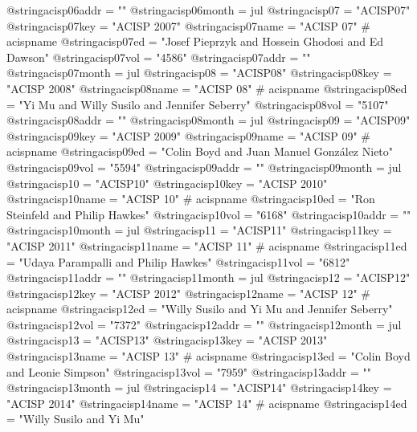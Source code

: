 @string{acisp06addr =           ""}
@string{acisp06month =          jul}
@string{acisp07 =               "ACISP07"}
@string{acisp07key =            "ACISP 2007"}
@string{acisp07name =           "ACISP 07" # acispname}
@string{acisp07ed =             "Josef Pieprzyk and Hossein Ghodosi and Ed Dawson"}
@string{acisp07vol =            "4586"}
@string{acisp07addr =           ""}
@string{acisp07month =          jul}
@string{acisp08 =               "ACISP08"}
@string{acisp08key =            "ACISP 2008"}
@string{acisp08name =           "ACISP 08" # acispname}
@string{acisp08ed =             "Yi Mu and Willy Susilo and Jennifer Seberry"}
@string{acisp08vol =            "5107"}
@string{acisp08addr =           ""}
@string{acisp08month =          jul}
@string{acisp09 =               "ACISP09"}
@string{acisp09key =            "ACISP 2009"}
@string{acisp09name =           "ACISP 09" # acispname}
@string{acisp09ed =             "Colin Boyd and Juan Manuel Gonz{\'a}lez Nieto"}
@string{acisp09vol =            "5594"}
@string{acisp09addr =           ""}
@string{acisp09month =          jul}
@string{acisp10 =               "ACISP10"}
@string{acisp10key =            "ACISP 2010"}
@string{acisp10name =           "ACISP 10" # acispname}
@string{acisp10ed =             "Ron Steinfeld and Philip Hawkes"}
@string{acisp10vol =            "6168"}
@string{acisp10addr =           ""}
@string{acisp10month =          jul}
@string{acisp11 =               "ACISP11"}
@string{acisp11key =            "ACISP 2011"}
@string{acisp11name =           "ACISP 11" # acispname}
@string{acisp11ed =             "Udaya Parampalli and Philip Hawkes"}
@string{acisp11vol =            "6812"}
@string{acisp11addr =           ""}
@string{acisp11month =          jul}
@string{acisp12 =               "ACISP12"}
@string{acisp12key =            "ACISP 2012"}
@string{acisp12name =           "ACISP 12" # acispname}
@string{acisp12ed =             "Willy Susilo and Yi Mu and Jennifer Seberry"}
@string{acisp12vol =            "7372"}
@string{acisp12addr =           ""}
@string{acisp12month =          jul}
@string{acisp13 =               "ACISP13"}
@string{acisp13key =            "ACISP 2013"}
@string{acisp13name =           "ACISP 13" # acispname}
@string{acisp13ed =             "Colin Boyd and Leonie Simpson"}
@string{acisp13vol =            "7959"}
@string{acisp13addr =           ""}
@string{acisp13month =          jul}
@string{acisp14 =               "ACISP14"}
@string{acisp14key =            "ACISP 2014"}
@string{acisp14name =           "ACISP 14" # acispname}
@string{acisp14ed =             "Willy Susilo and Yi Mu"}
